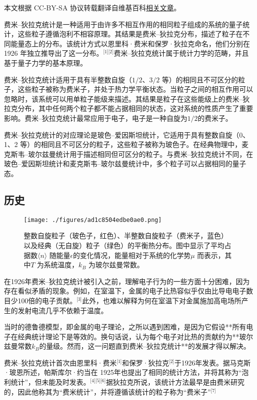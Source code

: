 
本文根据 CC-BY-SA 协议转载翻译自维基百科\href{https://en.wikipedia.org/wiki/Fermi\%E2\%80\%93Dirac_statistics}{相关文章}。

费米–狄拉克统计是一种适用于由许多不相互作用的相同粒子组成的系统的量子统计，这些粒子遵循泡利不相容原理。其结果是费米–狄拉克分布，描述了粒子在不同能量态上的分布。该统计方式以恩里科·费米和保罗·狄拉克命名，他们分别在 1926 年独立推导出了这一分布。\(^\text{[1][2]}\)费米–狄拉克统计属于统计力学的范畴，并且基于量子力学的基本原理。

费米–狄拉克统计适用于具有半整数自旋（\(1/2\)、\(3/2\) 等）的相同且不可区分的粒子，这些粒子被称为费米子，并处于热力学平衡状态。当粒子之间的相互作用可以忽略时，该系统可以用单粒子能级来描述。其结果是粒子在这些能级上的费米–狄拉克分布，其中任何两个粒子都不能占据相同的状态，这对系统的性质产生了重要影响。费米–狄拉克统计最常应用于电子，电子是一种自旋为\(1/2\)的费米子。

费米–狄拉克统计的对应理论是玻色–爱因斯坦统计，它适用于具有整数自旋（0、1、2 等）的相同且不可区分的粒子，这些粒子被称为玻色子。在经典物理中，麦克斯韦–玻尔兹曼统计用于描述相同但可区分的粒子。与费米–狄拉克统计不同，在玻色–爱因斯坦统计和麦克斯韦–玻尔兹曼统计中，多个粒子可以占据相同的量子态。
\subsection{历史}
\begin{figure}[ht]
\centering
\texttt{[image: ./figures/ad1c8504edbe0ae0.png]}
\caption{整数自旋粒子（玻色子，红色）、半整数自旋粒子（费米子，蓝色）以及经典（无自旋）粒子（绿色）的平衡热分布。图中显示了平均占据数\( \langle n \rangle \) 随能量\( \epsilon \)的变化情况，能量相对于系统的化学势\( \mu \) 而表示，其中\( T \) 为系统温度，\( k_B \) 为玻尔兹曼常数。} \label{fig_FermiD_1}
\end{figure}
在1926年费米–狄拉克统计被引入之前，理解电子行为的一些方面十分困难，因为存在看似矛盾的现象。例如，在室温下，金属的电子比热容似乎仅由比导电电子数目少100倍的电子贡献。\(^\text{[3]}\)此外，也难以解释为何在室温下对金属施加高电场所产生的发射电流几乎不依赖于温度。

当时的德鲁德模型，即金属的电子理论，之所以遇到困难，是因为它假设**所有电子在经典统计理论下是等效的。换句话说，认为每个电子对比热的贡献约为**玻尔兹曼常数\(k_B\)的量级。然而，这一问题直到费米–狄拉克统计**的发展才得以解决。  

费米–狄拉克统计首次由恩里科·费米\(^\text{[1]}\)和保罗·狄拉克\(^\text{[2]}\)于1926年发表。据马克斯·玻恩所述，帕斯库尔·约当在 1925年也提出了相同的统计方法，并将其称为“泡利统计”，但未能及时发表。\(^\text{[4][5][6]}\)据狄拉克所说，该统计方法最早是由费米研究的，因此他称其为“费米统计”，并将遵循该统计的粒子称为“费米子”\(^\text{[7]}\)  

